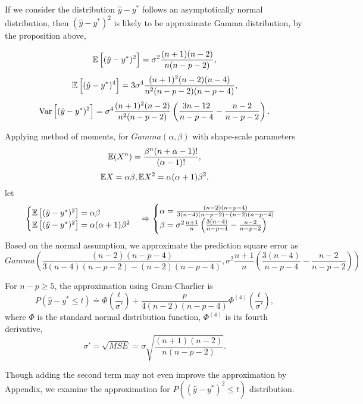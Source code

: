 If we consider the distribution $\hat{y}-y^*$ follows an asymptotically normal distribution, then $(\hat{y}-y^*)^{2}$ is likely to be approximate Gamma distribution, by the proposition above, 

\begin{equation}\label{MSE}
\mathbb{E}\left[(\hat{y}-y^*)^{2}\right]=\sigma^2\frac{(n+1)(n-2)}{n(n-p-2)},\end{equation}
\begin{equation}\mathbb{E}\left[(\hat{y}-y^*)^{4}\right] =3\sigma^4\frac{(n+1)^2(n-2)(n-4)}{n^2(n-p-2)(n-p-4)},\end{equation}
\begin{equation}\label{VarSE}
\mathrm{Var}\left[(\hat{y}-y^*)^{2}\right]= \sigma^4 \frac{(n+1)^2 (n-2)}{n^2(n-p-2)}\left(\frac{3n-12}{n-p-4}-\frac{n-2}{n-p-2}\right).\end{equation}

Applying method of moments, for $Gamma(\alpha,\beta)$ with shape-scale parameters
$$\mathbb{E}(X^n)=\frac{\beta^n(n+\alpha-1)!}{(\alpha-1)!},$$
$$\mathbb{E} X=\alpha\beta, \mathbb{E} X^2 = \alpha(\alpha+1)\beta^2,$$
let
$$\begin{cases}\mathbb{E}\left[(\hat{y}-y^*)^{2}\right]=\alpha\beta\\
\mathbb{E}\left[(\hat{y}-y^*)^{2}\right]=\alpha(\alpha+1)\beta^2\end{cases}
\Rightarrow
\begin{cases}
\alpha = \frac{(n-2)(n-p-4)}{3(n-4)(n-p-2)-(n-2)(n-p-4)}\\
\beta = \sigma^2\frac{n+1}{n}\left(\frac{3(n-4)}{n-p-4}-\frac{n-2}{n-p-2}\right)
\end{cases}$$
Based on the normal assumption, we approximate the prediction square error as 
\begin{equation}\label{gamma}
Gamma\left(\frac{(n-2)(n-p-4)}{3(n-4)(n-p-2)-(n-2)(n-p-4)},\sigma^2\frac{n+1}{n}\left(\frac{3(n-4)}{n-p-4}-\frac{n-2}{n-p-2}\right)\right)\end{equation}


For $n-p\geq 5$, the approximation using Gram-Charlier is
\begin{equation}\label{normal1}
P(\hat{y}-y^*\leq t) \doteq \Phi\left(\frac{t}{\sigma'}\right)+\frac{p}{4(n-2)(n-p-4)}\Phi^{(4)}\left(\frac{t}{\sigma'}\right),
\end{equation}
 where $\Phi$ is the standard normal distribution function, $\Phi^{(4)}$ is its fourth derivative, $$\sigma' = \sqrt{MSE} = \sigma \sqrt{\frac{(n+1)(n-2)}{n(n-p-2)}}.$$
 
Though adding the second term may not even improve the approximation by \cite{sawyer1982sample} Appendix, we examine the approximation for $P((\hat{y}-y^*)^2\leq t)$ distribution.

